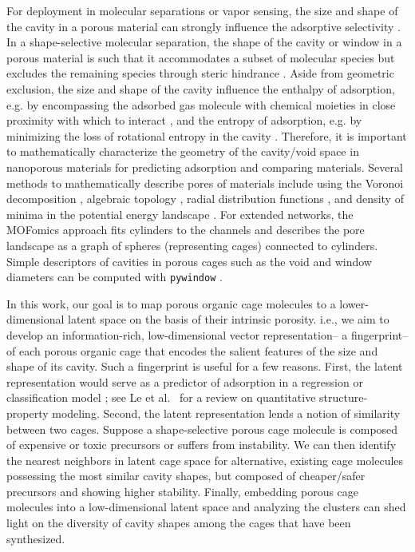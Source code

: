 \documentclass[journal=jacsat,manuscript=article,layout=traditional]{achemso}
\begin{document}
For deployment in molecular separations or vapor sensing, the size and shape of the cavity in a porous material can strongly influence the adsorptive selectivity \cite{mitra2013molecular,zhu1999shape,lee2018high,smit2008towards,sikora2012thermodynamic}. In a shape-selective molecular separation, the shape of the cavity or window in a porous material is such that it accommodates a subset of molecular species but excludes the remaining species through steric hindrance \cite{smit2008towards}. Aside from geometric exclusion, the size and shape of the cavity influence the enthalpy of adsorption, e.g. by encompassing the adsorbed gas molecule with chemical moieties in close proximity with which to interact \cite{simon2015best}, and the entropy of adsorption, e.g. by minimizing the loss of rotational entropy in the cavity \cite{denayer2005rotational}. Therefore, it is important to mathematically characterize the geometry of the cavity/void space in nanoporous materials for predicting adsorption and comparing materials. Several methods to mathematically describe pores of materials include using the Voronoi decomposition \cite{pinheiro2013characterization,martin2011addressing}, algebraic topology \cite{lee2017quantifying}, radial distribution functions \cite{fernandez2013atomic}, and density of minima in the potential energy landscape \cite{oganov2009quantify}. For extended networks, the MOFomics \cite{first2013mofomics} approach fits cylinders to the channels and describes the pore landscape as a graph of spheres (representing cages) connected to cylinders. Simple descriptors of cavities in porous cages such as the void and window diameters can be computed with \texttt{pywindow} \cite{miklitz2018pywindow}.

In this work, our goal is to map porous organic cage molecules to a lower-dimensional latent space on the basis of their intrinsic porosity. i.e., we aim to develop an information-rich, low-dimensional vector representation-- a fingerprint-- of each porous organic cage that encodes the salient features of the size and shape of its cavity. Such a fingerprint is useful for a few reasons. First, the latent representation would serve as a predictor of adsorption in a regression or classification model \cite{friedman2001elements}; see Le et al.~\cite{le2012quantitative} for a review on quantitative structure-property modeling. Second, the latent representation lends a notion of similarity between two cages. Suppose a shape-selective porous cage molecule is composed of expensive or toxic precursors or suffers from instability. We can then identify the nearest neighbors in latent cage space for alternative, existing cage molecules possessing the most similar cavity shapes, but composed of cheaper/safer precursors and showing higher stability. Finally, embedding porous cage molecules into a low-dimensional latent space and analyzing the clusters can shed light on the diversity of  cavity shapes among the cages that have been synthesized.
\end{document}
